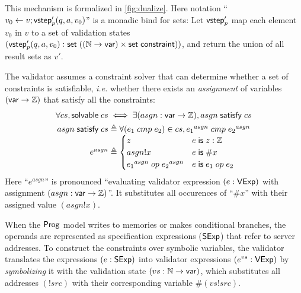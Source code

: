 This mechanism is formalized in \autoref{fig:dualize}.  Here notation
``$v_0\gets v;\mathsf{vstep}'_p(q,a,v_0)$'' is a monadic bind for sets: Let $\mathsf{vstep}'_p$
map each element $v_0$ in $v$ to a set of validation states
$(\mathsf{vstep}'_p(q,a,v_0):\mathsf{set}\;((\mathbb N\to\mathsf{var})\times\mathsf{set}\;\mathsf{constraint}))$, and return the
union of all result sets as $v'$.

The validator assumes a constraint solver that can determine whether a set of
constraints is satisfiable, {\it i.e.} whether there exists an {\em assignment}
of variables $(\mathsf{var}\to\mathbb Z)$ that satisfy all the constraints:
\begin{gather*}
  \forall cs,\solvable cs\iff\exists (asgn:\Var\to\Int),\satisfy{asgn}cs\\
  \begin{array}{r@{\;}l}
    \satisfy{asgn}cs\triangleq&\forall(e_1\ccmp e_2)\in cs, {e_1}^{asgn}\ccmp{e_2}^{asgn}\\
    e^{asgn}\triangleq&\begin{cases}
      z&e\Is z:\Int\\
      asgn!x&e\Is \#x\\
      {e_1}^{asgn}\oop{e_2}^{asgn}&e\Is e_1\oop e_2
    \end{cases}
  \end{array}
\end{gather*}
Here ``$e^{asgn}$'' is pronounced ``evaluating validator expression $(e:\mathsf{VExp})$
with assignment $(asgn:\mathsf{var}\to\mathbb Z)$''.  It substitutes all occurences of
``$\#x$'' with their assigned value $(asgn!x)$.

When the $\mathsf{Prog}$ model writes to memories or makes conditional branches, the
operands are represented as specification expressions ($\mathsf{SExp}$) that refer to
server addresses.  To construct the constraints over symbolic variables, the
validator translates the expressions $(e:\mathsf{SExp})$ into validator expressions
$(e^{vs}:\mathsf{VExp})$ by {\em symbolizing} it with the validation state
$(vs:\mathbb N\to\mathsf{var})$, which substitutes all addresses $(!src)$ with their
corresponding variable $\#(vs!src)$.

